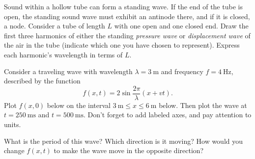 \documentclass[addpoints]{physlabs}
\date{\today}
\begin{document}
\maketitle

\begin{prelab}

\question[1] Sound within a hollow tube can form a standing wave. If the end of the tube is open, the standing sound wave must exhibit an antinode there, and if it is closed, a node. Consider a tube of length $L$ with one open and one closed end. Draw the first three harmonics of either the standing \textsl{pressure wave} or \textsl{displacement wave} of the air in the tube (indicate which one you have chosen to represent). Express each harmonic's wavelength in terms of $L$.
\begin{flushleft}
\end{flushleft}

\question[1] Consider a traveling wave with wavelength $\lambda=\qty{3}{\meter}$ and frequency $f=\qty{4}{\hertz}$, described by the function
\[
    f(x,t) = 2 \sin \frac{2\pi}{\lambda}(x+v t).
\]
Plot $f(x,0)$ below on the interval $\qty{3}{\meter}\le x\le \qty{6}{\meter}$ below. Then plot the wave at $t=\qty{250}{\milli\second}$ and $t=\qty{500}{\milli\second}$. Don't forget to add labeled axes, and pay attention to units. 
\begin{center}
\end{center}
What is the period of this wave?
Which direction is it moving?
How would you change $f(x,t)$ to make the wave move in the opposite direction?
\end{prelab}
\end{document}

